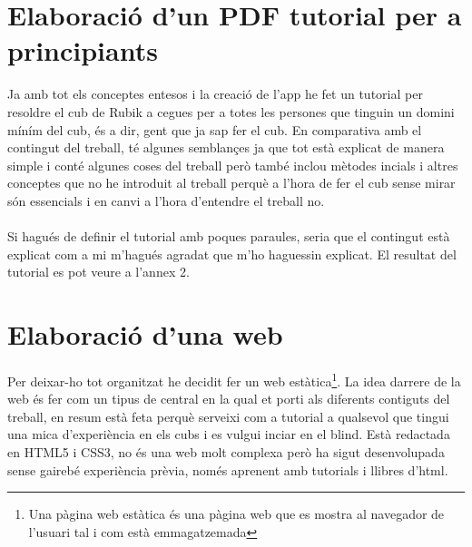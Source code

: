 \section{Elaboració d'un PDF tutorial per a principiants}

Ja amb tot els conceptes entesos i la creació de l'app he fet un tutorial per resoldre el cub de Rubik a cegues per a totes les persones que tinguin un domini míním del cub, és a dir, gent que ja sap fer el cub. 
En comparativa amb el contingut del treball, té algunes semblançes ja que tot està explicat de manera simple i conté algunes coses del treball però també inclou mètodes incials i altres conceptes que no he introduit al treball perquè a l'hora de fer el cub sense mirar són essencials i en canvi a l'hora d'entendre el treball no.
\\\\Si hagués de definir el tutorial amb poques paraules, seria que el contingut està explicat com a mi m'hagués agradat que m'ho haguessin explicat. El resultat del tutorial es pot veure a l'annex 2.




\section{Elaboració d'una web}

Per deixar-ho tot organitzat he decidit fer un web estàtica\footnote{Una pàgina web estàtica és una pàgina web que es mostra al navegador de l'usuari tal i com està emmagatzemada}. La idea darrere de la web és fer com un tipus de central en la qual et porti als diferents contiguts del treball, en resum està feta perquè serveixi com a tutorial a qualsevol que tingui una mica d'experiència en els cubs i es vulgui inciar en el blind.
Està redactada en HTML5 i CSS3, no és una web molt complexa però ha sigut desenvolupada sense gairebé experiència prèvia, només aprenent amb tutorials i llibres d'html.


